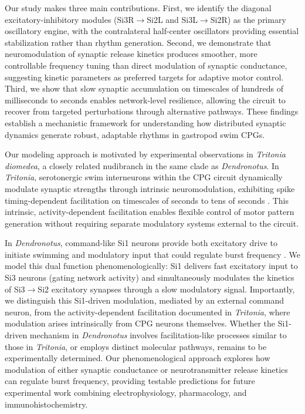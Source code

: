 \documentclass[nofootinbib,aip,amsmath,amssymb,preprint,twocolumn,floatfix,10pt]{revtex4-2}
\begin{document}
Our study makes three main contributions. First, we identify the diagonal excitatory-inhibitory modules (Si3R$\to$Si2L and Si3L$\to$Si2R) as the primary oscillatory engine, with the contralateral half-center oscillators providing essential stabilization rather than rhythm generation. Second, we demonstrate that neuromodulation of synaptic release kinetics produces smoother, more controllable frequency tuning than direct modulation of synaptic conductance, suggesting kinetic parameters as preferred targets for adaptive motor control. Third, we show that slow synaptic accumulation on timescales of hundreds of milliseconds to seconds enables network-level resilience, allowing the circuit to recover from targeted perturbations through alternative pathways. These findings establish a mechanistic framework for understanding how distributed synaptic dynamics generate robust, adaptable rhythms in gastropod swim CPGs.

Our modeling approach is motivated by experimental observations in \textit{Tritonia diomedea}, a closely related nudibranch in the same clade as \textit{Dendronotus}. In \textit{Tritonia}, serotonergic swim interneurons within the CPG circuit dynamically modulate synaptic strengths through intrinsic neuromodulation, exhibiting spike timing-dependent facilitation on timescales of seconds to tens of seconds \cite{katz1994dynamic, sakurai2003spike}. This intrinsic, activity-dependent facilitation enables flexible control of motor pattern generation without requiring separate modulatory systems external to the circuit.

In \textit{Dendronotus}, command-like Si1 neurons provide both excitatory drive to initiate swimming and modulatory input that could regulate burst frequency \cite{sakurai2019command}. We model this dual function phenomenologically: Si1 delivers fast excitatory input to Si3 neurons (gating network activity) and simultaneously modulates the kinetics of Si3$\to$Si2 excitatory synapses through a slow modulatory signal. Importantly, we distinguish this Si1-driven modulation, mediated by an external command neuron, from the activity-dependent facilitation documented in \textit{Tritonia}, where modulation arises intrinsically from CPG neurons themselves. Whether the Si1-driven mechanism in \textit{Dendronotus} involves facilitation-like processes similar to those in \textit{Tritonia}, or employs distinct molecular pathways, remains to be experimentally determined. Our phenomenological approach explores how modulation of either synaptic conductance or neurotransmitter release kinetics can regulate burst frequency, providing testable predictions for future experimental work combining electrophysiology, pharmacology, and immunohistochemistry.
\end{document}
